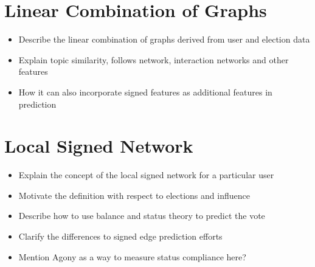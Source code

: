 \section{Linear Combination of Graphs}
\begin{itemize}
    \item Describe the linear combination of graphs derived from user and election data
    \item Explain topic similarity, follows network, interaction networks and other features
    \item How it can also incorporate signed features as additional features in prediction
\end{itemize}
\section{Local Signed Network}
\begin{itemize}
    \item Explain the concept of the local signed network for a particular user
    \item Motivate the definition with respect to elections and influence
    \item Describe how to use balance and status theory to predict the vote
    \item Clarify the differences to signed edge prediction efforts
    \item Mention Agony as a way to measure status compliance here?
\end{itemize}
